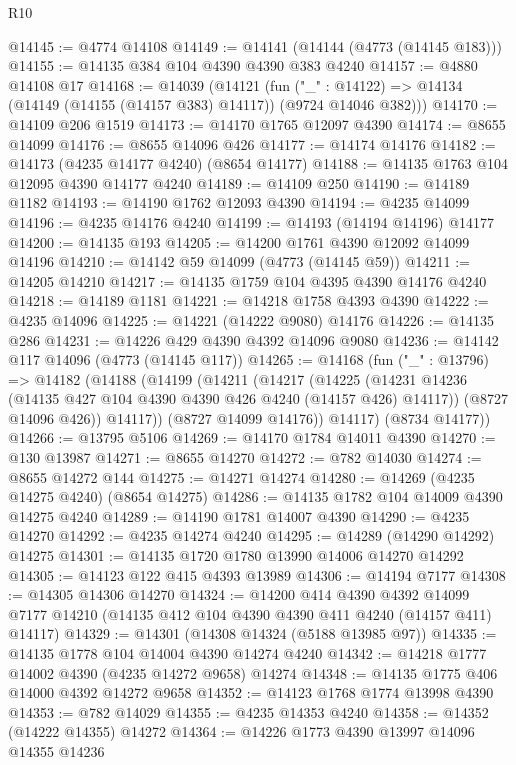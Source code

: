 \begin{lexlean}{R10}
\begin{coremodule}
@14145 := @4774 @14108
@14149 := @14141 (@14144 (@4773 (@14145 @183)))
@14155 := @14135 @384 @104 @4390 @4390 @383 @4240
@14157 := @4880 @14108 @17
@14168 := @14039
    (@14121
      (fun ("_" : @14122) => @14134 (@14149 (@14155 (@14157 @383) @14117)) (@9724 @14046 @382)))
@14170 := @14109 @206 @1519
@14173 := @14170 @1765 @12097 @4390
@14174 := @8655 @14099
@14176 := @8655 @14096 @426
@14177 := @14174 @14176
@14182 := @14173 (@4235 @14177 @4240) (@8654 @14177)
@14188 := @14135 @1763 @104 @12095 @4390 @14177 @4240
@14189 := @14109 @250
@14190 := @14189 @1182
@14193 := @14190 @1762 @12093 @4390
@14194 := @4235 @14099
@14196 := @4235 @14176 @4240
@14199 := @14193 (@14194 @14196) @14177
@14200 := @14135 @193
@14205 := @14200 @1761 @4390 @12092 @14099 @14196
@14210 := @14142 @59 @14099 (@4773 (@14145 @59))
@14211 := @14205 @14210
@14217 := @14135 @1759 @104 @4395 @4390 @14176 @4240
@14218 := @14189 @1181
@14221 := @14218 @1758 @4393 @4390
@14222 := @4235 @14096
@14225 := @14221 (@14222 @9080) @14176
@14226 := @14135 @286
@14231 := @14226 @429 @4390 @4392 @14096 @9080
@14236 := @14142 @117 @14096 (@4773 (@14145 @117))
@14265 := @14168
    (fun ("_" : @13796) =>
    @14182
      (@14188
        (@14199
          (@14211
            (@14217
              (@14225
                (@14231 @14236 (@14135 @427 @104 @4390 @4390 @426 @4240 (@14157 @426) @14117))
                (@8727 @14096 @426))
              @14117))
          (@8727 @14099 @14176))
        @14117)
      (@8734 @14177))
@14266 := @13795 @5106
@14269 := @14170 @1784 @14011 @4390
@14270 := @130 @13987
@14271 := @8655 @14270
@14272 := @782 @14030
@14274 := @8655 @14272 @144
@14275 := @14271 @14274
@14280 := @14269 (@4235 @14275 @4240) (@8654 @14275)
@14286 := @14135 @1782 @104 @14009 @4390 @14275 @4240
@14289 := @14190 @1781 @14007 @4390
@14290 := @4235 @14270
@14292 := @4235 @14274 @4240
@14295 := @14289 (@14290 @14292) @14275
@14301 := @14135 @1720 @1780 @13990 @14006 @14270 @14292
@14305 := @14123 @122 @415 @4393 @13989
@14306 := @14194 @7177
@14308 := @14305 @14306 @14270
@14324 := @14200
    @414
    @4390
    @4392
    @14099
    @7177
    @14210
    (@14135 @412 @104 @4390 @4390 @411 @4240 (@14157 @411) @14117)
@14329 := @14301 (@14308 @14324 (@5188 @13985 @97))
@14335 := @14135 @1778 @104 @14004 @4390 @14274 @4240
@14342 := @14218 @1777 @14002 @4390 (@4235 @14272 @9658) @14274
@14348 := @14135 @1775 @406 @14000 @4392 @14272 @9658
@14352 := @14123 @1768 @1774 @13998 @4390
@14353 := @782 @14029
@14355 := @4235 @14353 @4240
@14358 := @14352 (@14222 @14355) @14272
@14364 := @14226 @1773 @4390 @13997 @14096 @14355 @14236

\end{coremodule}
\end{lexlean}

